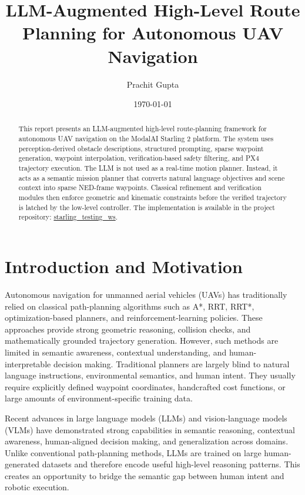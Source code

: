\documentclass[11pt]{article}
\title{\textbf{LLM-Augmented High-Level Route Planning for Autonomous UAV Navigation}}
\author{
Prachit Gupta\\
}
\date{\today}
\begin{document}
\maketitle

\begin{abstract}
This report presents an LLM-augmented high-level route-planning framework for autonomous UAV navigation on the ModalAI Starling 2 platform. The system uses perception-derived obstacle descriptions, structured prompting, sparse waypoint generation, waypoint interpolation, verification-based safety filtering, and PX4 trajectory execution. The LLM is not used as a real-time motion planner. Instead, it acts as a semantic mission planner that converts natural language objectives and scene context into sparse NED-frame waypoints. Classical refinement and verification modules then enforce geometric and kinematic constraints before the verified trajectory is latched by the low-level controller. The implementation is available in the project repository:
\href{https://github.com/prachitgupta/starling_testing_ws}{starling\_testing\_ws}.
\end{abstract}

\section{Introduction and Motivation}

Autonomous navigation for unmanned aerial vehicles (UAVs) has traditionally relied on classical path-planning algorithms such as A*, RRT, RRT*, optimization-based planners, and reinforcement-learning policies. These approaches provide strong geometric reasoning, collision checks, and mathematically grounded trajectory generation. However, such methods are limited in semantic awareness, contextual understanding, and human-interpretable decision making. Traditional planners are largely blind to natural language instructions, environmental semantics, and human intent. They usually require explicitly defined waypoint coordinates, handcrafted cost functions, or large amounts of environment-specific training data.

Recent advances in large language models (LLMs) and vision-language models (VLMs) have demonstrated strong capabilities in semantic reasoning, contextual awareness, human-aligned decision making, and generalization across domains. Unlike conventional path-planning methods, LLMs are trained on large human-generated datasets and therefore encode useful high-level reasoning patterns. This creates an opportunity to bridge the semantic gap between human intent and robotic execution.
\end{document}
